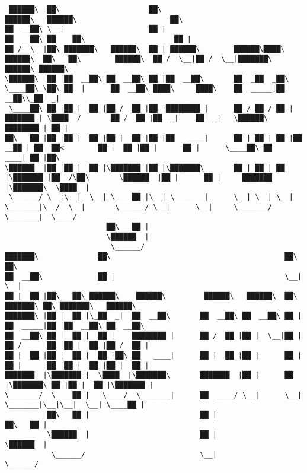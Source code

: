 \documentclass[varwidth=\maxdimen,margin=0.5cm,multi={verbatim}]{standalone}
\begin{document}
\begin{verbatim}
 ██████\  ██\                     ██\                                                                    ██████\   ██████\                      ██\
██  __██\ \__|                    ██ |                                                                  ██  __██\ ██  __██\                     ██ |
██ /  \__|██\ ███████\   ██████\  ██ | ██████\        ██████\████\   ██████\  ██\   ██\        ██████\  ██ /  \__|██ /  \__|███████\  ██████\ ██████\
\██████\  ██ |██  __██\ ██  __██\ ██ |██  __██\       ██  _██  _██\  \____██\ \██\ ██  |      ██  __██\ ████\     ████\    ██  _____|██  __██\\_██  _|
 \____██\ ██ |██ |  ██ |██ /  ██ |██ |████████ |      ██ / ██ / ██ | ███████ | \████  /       ██ /  ██ |██  _|    ██  _|   \██████\  ████████ | ██ |
██\   ██ |██ |██ |  ██ |██ |  ██ |██ |██   ____|      ██ | ██ | ██ |██  __██ | ██  ██<        ██ |  ██ |██ |      ██ |      \____██\ ██   ____| ██ |██\
\██████  |██ |██ |  ██ |\███████ |██ |\███████\       ██ | ██ | ██ |\███████ |██  /\██\       \██████  |██ |      ██ |     ███████  |\███████\  \████  |
 \______/ \__|\__|  \__| \____██ |\__| \_______|      \__| \__| \__| \_______|\__/  \__|       \______/ \__|      \__|     \_______/  \_______|  \____/
                        ██\   ██ |
                        \██████  |
                         \______/
███████\              ██\                                         ██\           ██\
██  __██\             ██ |                                        \__|          \__|
██ |  ██ |██\   ██\ ██████\    ██████\         ██████\   ██████\  ██\  ███████\ ██\ ███████\   ██████\
███████\ |██ |  ██ |\_██  _|  ██  __██\       ██  __██\ ██  __██\ ██ |██  _____|██ |██  __██\ ██  __██\
██  __██\ ██ |  ██ |  ██ |    ████████ |      ██ /  ██ |██ |  \__|██ |██ /      ██ |██ |  ██ |██ /  ██ |
██ |  ██ |██ |  ██ |  ██ |██\ ██   ____|      ██ |  ██ |██ |      ██ |██ |      ██ |██ |  ██ |██ |  ██ |
███████  |\███████ |  \████  |\███████\       ███████  |██ |      ██ |\███████\ ██ |██ |  ██ |\███████ |
\_______/  \____██ |   \____/  \_______|      ██  ____/ \__|      \__| \_______|\__|\__|  \__| \____██ |
          ██\   ██ |                          ██ |                                            ██\   ██ |
          \██████  |                          ██ |                                            \██████  |
           \______/                           \__|                                             \______/



\end{verbatim}
\end{document}

